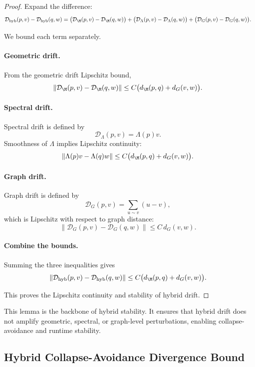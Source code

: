 \begin{proof}
Expand the difference:
\[
\mathcal{D}_{\mathrm{hyb}}(p,v)
-
\mathcal{D}_{\mathrm{hyb}}(q,w)
=
\big(\mathcal{D}_\M(p,v) - \mathcal{D}_\M(q,w)\big)
+
\big(\mathcal{D}_\Lambda(p,v) - \mathcal{D}_\Lambda(q,w)\big)
+
\big(\mathcal{D}_G(p,v) - \mathcal{D}_G(q,w)\big).
\]

We bound each term separately.

\paragraph{Geometric drift.}
From the geometric drift Lipschitz bound,
\[
\|\mathcal{D}_\M(p,v) - \mathcal{D}_\M(q,w)\|
\le
C\big(d_\M(p,q) + d_G(v,w)\big).
\]

\paragraph{Spectral drift.}
Spectral drift is defined by
\[
\mathcal{D}_\Lambda(p,v)
=
\Lambda(p)v.
\]
Smoothness of $\Lambda$ implies Lipschitz continuity:
\[
\|\Lambda(p)v - \Lambda(q)w\|
\le
C\big(d_\M(p,q) + d_G(v,w)\big).
\]

\paragraph{Graph drift.}
Graph drift is defined by
\[
\mathcal{D}_G(p,v)
=
\sum_{u \sim v} (u - v),
\]
which is Lipschitz with respect to graph distance:
\[
\|\mathcal{D}_G(p,v) - \mathcal{D}_G(q,w)\|
\le
C\, d_G(v,w).
\]

\paragraph{Combine the bounds.}
Summing the three inequalities gives
\[
\|\mathcal{D}_{\mathrm{hyb}}(p,v)
-
\mathcal{D}_{\mathrm{hyb}}(q,w)\|
\le
C\big(d_\M(p,q) + d_G(v,w)\big).
\]

This proves the Lipschitz continuity and stability of hybrid drift.
\end{proof}

\begin{remark}
This lemma is the backbone of hybrid stability.  
It ensures that hybrid drift does not amplify geometric, spectral, or
graph-level perturbations, enabling collapse-avoidance and runtime
stability.
\end{remark}

\subsection{Hybrid Collapse-Avoidance Divergence Bound}

